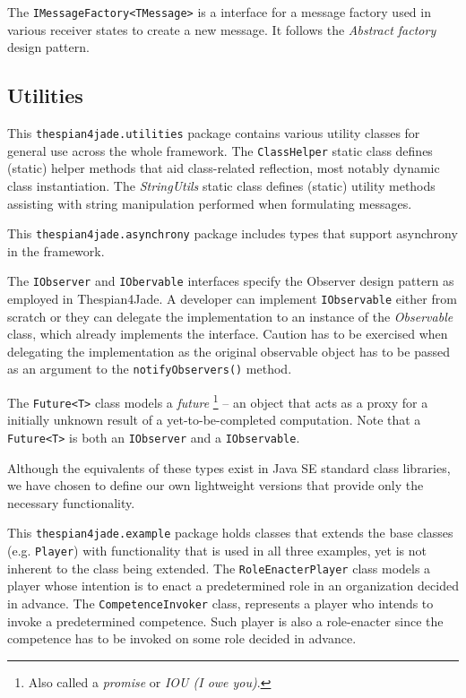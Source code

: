 The \texttt{IMessageFactory<TMessage>} is a interface for a message factory used in various receiver states to create a new message.
It follows the \textit{Abstract factory} design pattern.

\subsection{Utilities}

This \texttt{thespian4jade.utilities} package contains various utility classes for general use across the whole framework.
The \texttt{ClassHelper} static class defines (static) helper methods that aid class-related reflection, most notably dynamic class instantiation.
The \textit{StringUtils} static class defines (static) utility methods assisting with string manipulation performed when formulating messages.

This \texttt{thespian4jade.asynchrony} package includes types that support asynchrony in the framework.

The \texttt{IObserver} and \texttt{IObervable} interfaces specify the Observer design pattern as employed in Thespian4Jade.
A developer can implement \texttt{IObservable} either from scratch or they can delegate the implementation to an instance of the \textit{Observable} class, which already implements the interface.
Caution has to be exercised when delegating the implementation as the original observable object has to be passed as an argument to the \texttt{notifyObservers()} method.

The \texttt{Future<T>} class models a \textit{future}
\footnote{Also called a \textit{promise} or \textit{IOU (I owe you)}.}
 -- an object that acts as a proxy for a initially unknown result of a yet-to-be-completed computation.
Note that a \texttt{Future<T>} is both an \texttt{IObserver} and a \texttt{IObservable}.

Although the equivalents of these types exist in Java SE standard class libraries, we have chosen to define our own lightweight versions that provide only the necessary functionality. 

This \texttt{thespian4jade.example} package holds classes that extends the base classes (e.g. \texttt{Player}) with functionality that is used in all three examples, yet is not inherent to the class being extended.
The \texttt{RoleEnacterPlayer} class models a player whose intention is to enact a predetermined role in an organization decided in advance.
The \texttt{CompetenceInvoker} class, represents a player who intends to invoke a predetermined competence. Such player is also a role-enacter since the competence has to be invoked on some role decided in advance.  